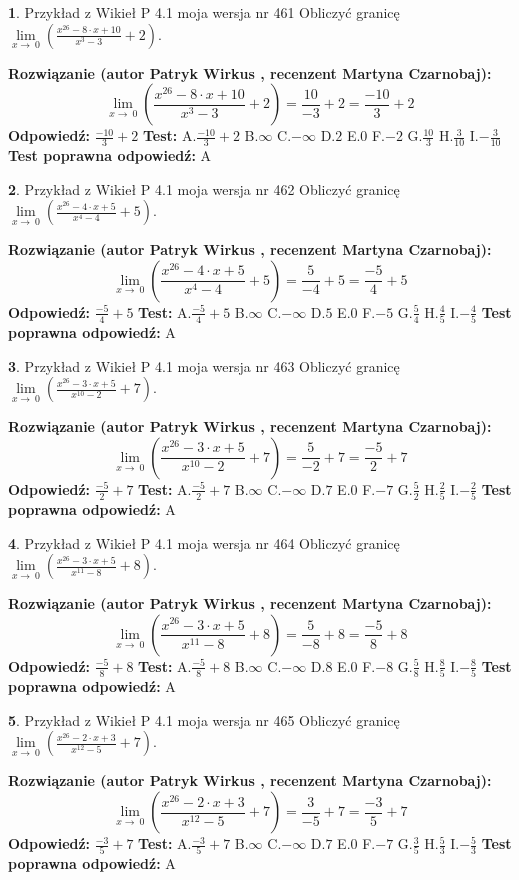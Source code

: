 \documentclass[12pt, a4paper]{article}
\theoremstyle{definition} %
\newtheorem{zad}{}
\newcommand{\zadStart}[1]{\begin{zad}#1\newline}
\newcommand{\zadStop}{\end{zad}}
\newcommand{\rozwStart}[2]{\noindent \textbf{Rozwiązanie (autor #1 , recenzent #2): }\newline}
\newcommand{\rozwStop}{\newline}
\newcommand{\odpStart}{\noindent \textbf{Odpowiedź:}\newline}
\newcommand{\odpStop}{\newline}
\newcommand{\testStart}{\noindent \textbf{Test:}\newline}
\newcommand{\testStop}{\newline}
\newcommand{\kluczStart}{\noindent \textbf{Test poprawna odpowiedź:}\newline}
\newcommand{\kluczStop}{\newline}
\begin{document}
\zadStart{Przykład z Wikieł P 4.1 moja wersja nr 461}
Obliczyć granicę $\lim\limits_{x\to\ 0}(\frac{x^{26}-8 \cdot x +10}{x^{3}-3}+2)$.
\zadStop
\rozwStart{Patryk Wirkus}{Martyna Czarnobaj}
$$\lim\limits_{x\to\ 0}(\frac{x^{26}-8 \cdot x +10}{x^{3}-3}+2)=\frac{10}{-3}+2=\frac{-10}{3}+2$$
\rozwStop
\odpStart
$\frac{-10}{3}+2$
\odpStop
\testStart
A.$\frac{-10}{3}+2$
B.$\infty$
C.$-\infty$
D.$2$
E.$0$
F.$-2$
G.$\frac{10}{3}$
H.$\frac{3}{10}$
I.$-\frac{3}{10}$
\testStop
\kluczStart
A
\kluczStop



\zadStart{Przykład z Wikieł P 4.1 moja wersja nr 462}
Obliczyć granicę $\lim\limits_{x\to\ 0}(\frac{x^{26}-4 \cdot x +5}{x^{4}-4}+5)$.
\zadStop
\rozwStart{Patryk Wirkus}{Martyna Czarnobaj}
$$\lim\limits_{x\to\ 0}(\frac{x^{26}-4 \cdot x +5}{x^{4}-4}+5)=\frac{5}{-4}+5=\frac{-5}{4}+5$$
\rozwStop
\odpStart
$\frac{-5}{4}+5$
\odpStop
\testStart
A.$\frac{-5}{4}+5$
B.$\infty$
C.$-\infty$
D.$5$
E.$0$
F.$-5$
G.$\frac{5}{4}$
H.$\frac{4}{5}$
I.$-\frac{4}{5}$
\testStop
\kluczStart
A
\kluczStop



\zadStart{Przykład z Wikieł P 4.1 moja wersja nr 463}
Obliczyć granicę $\lim\limits_{x\to\ 0}(\frac{x^{26}-3 \cdot x +5}{x^{10}-2}+7)$.
\zadStop
\rozwStart{Patryk Wirkus}{Martyna Czarnobaj}
$$\lim\limits_{x\to\ 0}(\frac{x^{26}-3 \cdot x +5}{x^{10}-2}+7)=\frac{5}{-2}+7=\frac{-5}{2}+7$$
\rozwStop
\odpStart
$\frac{-5}{2}+7$
\odpStop
\testStart
A.$\frac{-5}{2}+7$
B.$\infty$
C.$-\infty$
D.$7$
E.$0$
F.$-7$
G.$\frac{5}{2}$
H.$\frac{2}{5}$
I.$-\frac{2}{5}$
\testStop
\kluczStart
A
\kluczStop



\zadStart{Przykład z Wikieł P 4.1 moja wersja nr 464}
Obliczyć granicę $\lim\limits_{x\to\ 0}(\frac{x^{26}-3 \cdot x +5}{x^{11}-8}+8)$.
\zadStop
\rozwStart{Patryk Wirkus}{Martyna Czarnobaj}
$$\lim\limits_{x\to\ 0}(\frac{x^{26}-3 \cdot x +5}{x^{11}-8}+8)=\frac{5}{-8}+8=\frac{-5}{8}+8$$
\rozwStop
\odpStart
$\frac{-5}{8}+8$
\odpStop
\testStart
A.$\frac{-5}{8}+8$
B.$\infty$
C.$-\infty$
D.$8$
E.$0$
F.$-8$
G.$\frac{5}{8}$
H.$\frac{8}{5}$
I.$-\frac{8}{5}$
\testStop
\kluczStart
A
\kluczStop



\zadStart{Przykład z Wikieł P 4.1 moja wersja nr 465}
Obliczyć granicę $\lim\limits_{x\to\ 0}(\frac{x^{26}-2 \cdot x +3}{x^{12}-5}+7)$.
\zadStop
\rozwStart{Patryk Wirkus}{Martyna Czarnobaj}
$$\lim\limits_{x\to\ 0}(\frac{x^{26}-2 \cdot x +3}{x^{12}-5}+7)=\frac{3}{-5}+7=\frac{-3}{5}+7$$
\rozwStop
\odpStart
$\frac{-3}{5}+7$
\odpStop
\testStart
A.$\frac{-3}{5}+7$
B.$\infty$
C.$-\infty$
D.$7$
E.$0$
F.$-7$
G.$\frac{3}{5}$
H.$\frac{5}{3}$
I.$-\frac{5}{3}$
\testStop
\kluczStart
A
\kluczStop
\end{document}
